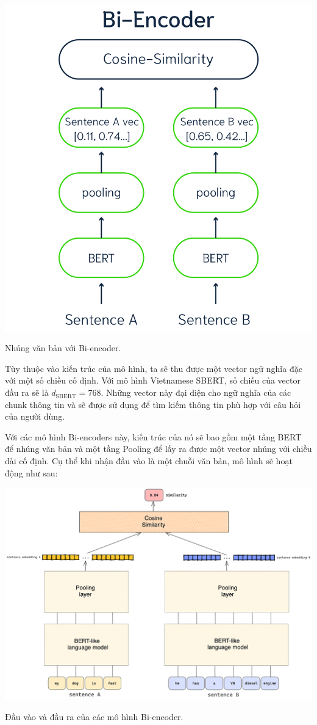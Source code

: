 \documentclass[a4paper, 12pt, openany]{book}
\begin{document}
\begin{minipage}{\linewidth}
    \centering
    \includegraphics[width=.7\linewidth]{./assets/images/bi-encoder.png}
    \captionsetup{type=figure}
    \caption{Nhúng văn bản với Bi-encoder.}
\end{minipage}

\vspace{0.5cm}

Tùy thuộc vào kiến trúc của mô hình, ta sẽ thu được một vector ngữ nghĩa đặc với một số chiều cố định.
Với mô hình Vietnamese SBERT, số chiều của vector đầu ra sẽ là \(d_{\text{SBERT}} = 768\).
Những vector này đại diện cho ngữ nghĩa của các chunk thông tin và sẽ được sử dụng để tìm kiếm thông tin phù hợp với câu hỏi của người dùng.

Với các mô hình Bi-encoders này, kiến trúc của nó sẽ bao gồm một tầng BERT để nhúng văn bản và một tầng Pooling để lấy ra được một vector nhúng với chiều dài cố định.
Cụ thể khi nhận đầu vào là một chuỗi văn bản, mô hình sẽ hoạt động như sau:

\vspace{0.5cm}

\begin{minipage}{\linewidth}
    \centering
    \includegraphics[width=\linewidth]{./assets/images/bi-encoder-io.png}
    \captionsetup{type=figure}
    \caption{Đầu vào và đầu ra của các mô hình Bi-encoder.}
    \label{fig:bi-encoder-io}
\end{minipage}
\end{document}
